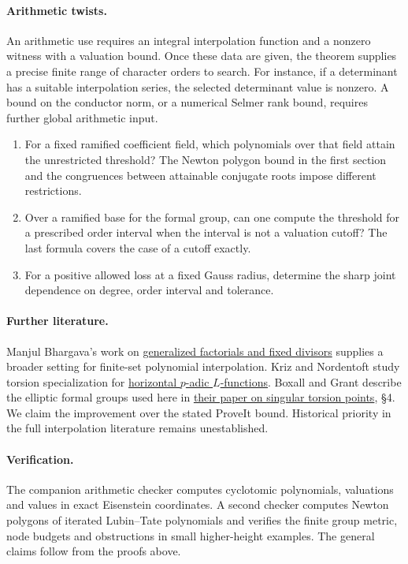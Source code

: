 \documentclass[11pt]{article}
\begin{document}
\paragraph{Arithmetic twists.}
An arithmetic use requires an integral interpolation function and a
nonzero witness with a valuation bound. Once these data are given,
the theorem supplies a precise finite range of character orders to
search. For instance, if a determinant has a suitable interpolation
series, the selected determinant value is nonzero. A bound on the
conductor norm, or a numerical Selmer rank bound, requires further
global arithmetic input.
\begin{enumerate}
\item For a fixed ramified coefficient field, which polynomials over
that field attain the unrestricted threshold? The Newton polygon
bound in the first section and the congruences between attainable
conjugate roots impose different restrictions.
\item Over a ramified base for the formal group, can one compute the
threshold for a prescribed order interval when the interval is not a
valuation cutoff? The last formula covers the case of a cutoff exactly.
\item For a positive allowed loss at a fixed Gauss radius, determine the
sharp joint dependence on degree, order interval and tolerance.
\end{enumerate}
\paragraph{Further literature.}
Manjul Bhargava's work on
\href{https://doi.org/10.1006/jnth.1998.2220}{generalized factorials and
fixed divisors} supplies a broader setting for finite-set polynomial
interpolation. Kriz and Nordentoft study torsion specialization for
\href{https://arxiv.org/abs/2310.20678}{horizontal $p$-adic $L$-functions}.
Boxall and Grant describe the elliptic formal groups used here in
\href{https://boxall.pages.math.cnrs.fr/pages-web-mathematiques-de-john-boxall/wwwMaths/SingularFinal.pdf}{their
paper on singular torsion points}, \S4. We claim the improvement over
the stated ProveIt bound. Historical priority in the full interpolation
literature remains unestablished.

\paragraph{Verification.} The companion arithmetic checker computes
cyclotomic polynomials, valuations and values in exact Eisenstein
coordinates. A second checker computes Newton polygons of iterated
Lubin--Tate polynomials and verifies the finite group metric, node
budgets and obstructions in small higher-height examples. The general
claims follow from the proofs above.
\end{document}
